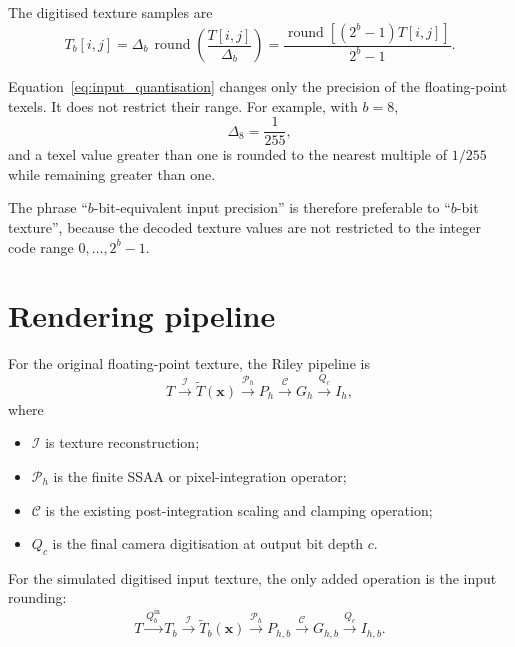 \documentclass[11pt,a4paper]{article}
\begin{document}
The digitised texture samples are
\begin{equation}
    T_b[i,j]
    = \Delta_b\,\operatorname{round}\!\left(\frac{T[i,j]}{\Delta_b}\right)
    = \frac{\operatorname{round}\!\left[(2^b-1)T[i,j]\right]}{2^b-1}.
    \label{eq:input_quantisation}
\end{equation}

Equation~\eqref{eq:input_quantisation} changes only the precision of the floating-point texels. It does not restrict their range. For example, with $b=8$,
\begin{equation}
    \Delta_8 = \frac{1}{255},
\end{equation}
and a texel value greater than one is rounded to the nearest multiple of $1/255$ while remaining greater than one.

The phrase ``$b$-bit-equivalent input precision'' is therefore preferable to ``$b$-bit texture'', because the decoded texture values are not restricted to the integer code range $0,\ldots,2^b-1$.

\section{Rendering pipeline}

For the original floating-point texture, the Riley pipeline is
\begin{equation}
    T
    \xrightarrow{\mathcal I}
    \widetilde T(\bm{x})
    \xrightarrow{\mathcal P_h}
    P_h
    \xrightarrow{\mathcal C}
    G_h
    \xrightarrow{Q_c}
    I_h,
\end{equation}
where
\begin{itemize}
    \item $\mathcal I$ is texture reconstruction;
    \item $\mathcal P_h$ is the finite SSAA or pixel-integration operator;
    \item $\mathcal C$ is the existing post-integration scaling and clamping operation;
    \item $Q_c$ is the final camera digitisation at output bit depth $c$.
\end{itemize}

For the simulated digitised input texture, the only added operation is the input rounding:
\begin{equation}
    T
    \xrightarrow{Q_b^{\mathrm{in}}}
    T_b
    \xrightarrow{\mathcal I}
    \widetilde T_b(\bm{x})
    \xrightarrow{\mathcal P_h}
    P_{h,b}
    \xrightarrow{\mathcal C}
    G_{h,b}
    \xrightarrow{Q_c}
    I_{h,b}.
\end{equation}
\end{document}
